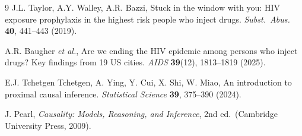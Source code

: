 \documentclass[11pt]{article}
\theoremstyle{definition}
\theoremstyle{remark}
\begin{document}
\begin{thebibliography}{9}
J.L. Taylor, A.Y. Walley, A.R. Bazzi, Stuck in the window with you: HIV exposure prophylaxis in the highest risk people who inject drugs. \textit{Subst.\ Abus.} \textbf{40}, 441--443 (2019).

A.R. Baugher \textit{et al.}, Are we ending the HIV epidemic among persons who inject drugs? Key findings from 19 US cities. \textit{AIDS} \textbf{39}(12), 1813--1819 (2025).

E.J. Tchetgen Tchetgen, A. Ying, Y. Cui, X. Shi, W. Miao, An introduction to proximal causal inference. \textit{Statistical Science} \textbf{39}, 375--390 (2024).

J. Pearl, \textit{Causality: Models, Reasoning, and Inference}, 2nd ed.\ (Cambridge University Press, 2009).
\end{thebibliography}
\end{document}
